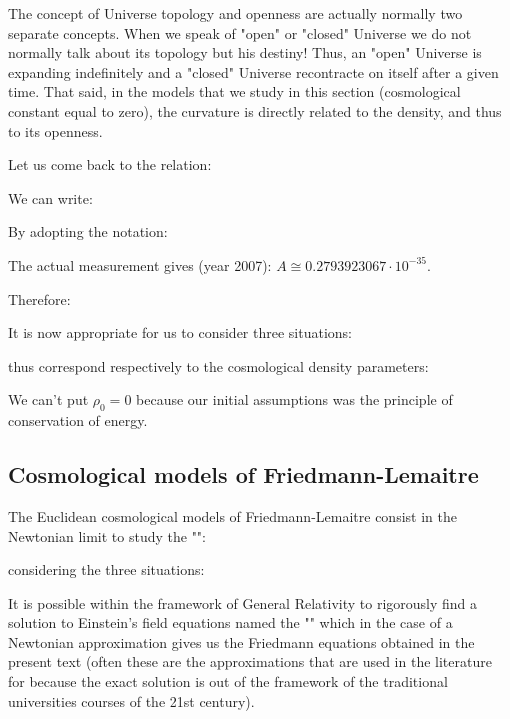 	\begin{tcolorbox}[title=Remark,colframe=black,arc=10pt]
	The concept of Universe topology and openness are actually normally two separate concepts. When we speak of "open" or "closed" Universe we do not normally talk about its topology but his destiny! Thus, an "open" Universe is expanding indefinitely and a "closed" Universe recontracte on itself after a given time. That said, in the models that we study in this section (cosmological constant equal to zero), the curvature is directly related to the density, and thus to its openness.
	\end{tcolorbox}
	Let us come back to the relation:
	
	We can write:
	
	By adopting the notation:
	
	\begin{tcolorbox}[title=Remark,colframe=black,arc=10pt]
	The actual measurement gives (year 2007): $A\cong 0.2793923067\cdot 10^{-35}$.
	\end{tcolorbox}
	Therefore:
	
	It is now appropriate for us to consider three situations:
	
	thus correspond respectively to the cosmological density parameters:
	
	\begin{tcolorbox}[title=Remark,colframe=black,arc=10pt]
	We can't put $\rho_0=0$ because our initial assumptions was the principle of conservation of energy.
	\end{tcolorbox}
	
	\pagebreak	
	\subsection{Cosmological models of Friedmann-Lemaitre}
	The Euclidean cosmological models of Friedmann-Lemaitre consist in the Newtonian  limit to study the  "":
	
	considering the three situations:
	
	\begin{tcolorbox}[title=Remark,colframe=black,arc=10pt]
	It is possible within the framework of General Relativity to rigorously find a solution to Einstein's field equations named the "" which in the case of a Newtonian approximation gives us the Friedmann equations obtained in the present text (often these are the approximations that are used in the literature for because the exact solution is out of the  framework of the traditional universities courses of the 21st century).
	\end{tcolorbox}
